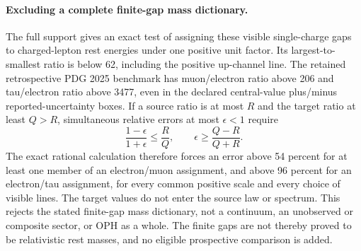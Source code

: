 \paragraph{Excluding a complete finite-gap mass dictionary.}
The full support gives an exact test of assigning these visible
single-charge gaps to charged-lepton rest energies under one positive
unit factor.  Its largest-to-smallest ratio is below 62, including the
positive up-channel line.  The retained retrospective PDG 2025 benchmark
has muon/electron ratio above 206 and tau/electron ratio above 3477,
even in the declared central-value plus/minus reported-uncertainty boxes.
If a source ratio is at most $R$ and the target ratio at least $Q>R$,
simultaneous relative errors at most $\epsilon<1$ require
\[
 \frac{1-\epsilon}{1+\epsilon}\leq\frac RQ,
 \qquad \epsilon\geq\frac{Q-R}{Q+R}.
\]
The exact rational calculation therefore forces an error above 54 percent
for at least one member of an electron/muon assignment, and above
96 percent for an electron/tau assignment, for every common positive
scale and every choice of visible lines.  The target values do not enter
the source law or spectrum.  This rejects the stated finite-gap mass
dictionary, not a continuum, an unobserved or composite sector, or OPH
as a whole.  The finite gaps are not thereby proved to be relativistic
rest masses, and no eligible prospective comparison is added.
